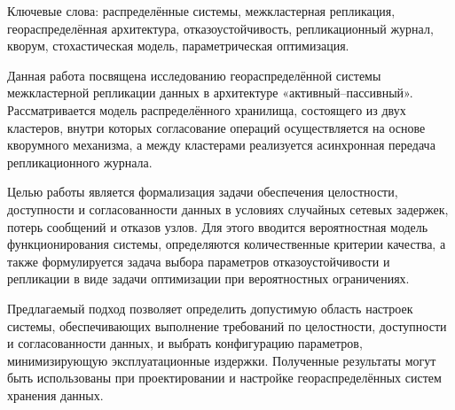 \abstract

Ключевые слова: распределённые системы, межкластерная репликация,
геораспределённая архитектура, отказоустойчивость,
репликационный журнал, кворум, стохастическая модель,
параметрическая оптимизация.

Данная работа посвящена исследованию геораспределённой системы
межкластерной репликации данных в архитектуре «активный–пассивный».
Рассматривается модель распределённого хранилища,
состоящего из двух кластеров,
внутри которых согласование операций осуществляется
на основе кворумного механизма,
а между кластерами реализуется асинхронная передача
репликационного журнала.

Целью работы является формализация задачи обеспечения
целостности, доступности и согласованности данных
в условиях случайных сетевых задержек,
потерь сообщений и отказов узлов.
Для этого вводится вероятностная модель функционирования системы,
определяются количественные критерии качества,
а также формулируется задача выбора параметров
отказоустойчивости и репликации
в виде задачи оптимизации при вероятностных ограничениях.

Предлагаемый подход позволяет определить допустимую область
настроек системы, обеспечивающих выполнение требований
по целостности, доступности и согласованности данных,
и выбрать конфигурацию параметров,
минимизирующую эксплуатационные издержки.
Полученные результаты могут быть использованы
при проектировании и настройке
геораспределённых систем хранения данных.
